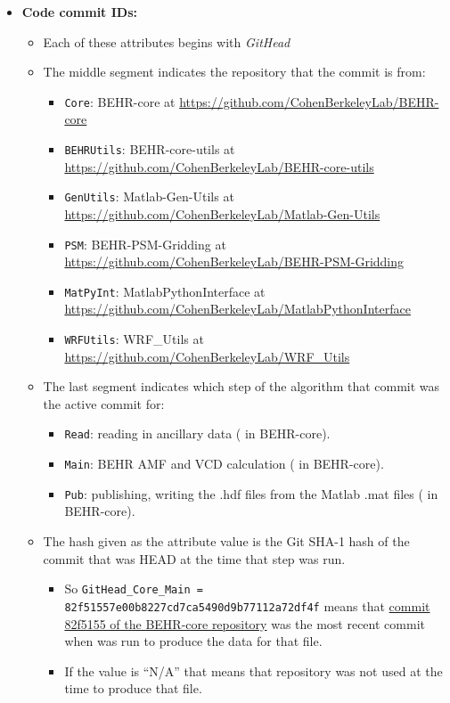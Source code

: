 \documentclass[12pt]{article}
\begin{document}
\begin{itemize}
	\item \textbf{Code commit IDs:}
		\begin{itemize}
		\item Each of these attributes begins with \emph{GitHead}
		\item The middle segment indicates the repository that the commit is from:
			\begin{itemize}
			\item \lstinline$Core$: BEHR-core at \url{https://github.com/CohenBerkeleyLab/BEHR-core}
			\item \lstinline$BEHRUtils$: BEHR-core-utils at \url{https://github.com/CohenBerkeleyLab/BEHR-core-utils}
			\item \lstinline$GenUtils$: Matlab-Gen-Utils at \url{https://github.com/CohenBerkeleyLab/Matlab-Gen-Utils}
			\item \lstinline$PSM$: BEHR-PSM-Gridding at \url{https://github.com/CohenBerkeleyLab/BEHR-PSM-Gridding}
			\item \lstinline$MatPyInt$: MatlabPythonInterface at \url{https://github.com/CohenBerkeleyLab/MatlabPythonInterface}
			\item \lstinline$WRFUtils$: WRF\_Utils at \url{https://github.com/CohenBerkeleyLab/WRF_Utils}
			\end{itemize}
		
		\item The last segment indicates which step of the algorithm that commit was the active commit for:
			\begin{itemize}
			\item \lstinline$Read$: reading in ancillary data ( in BEHR-core).
			\item \lstinline$Main$: BEHR AMF and VCD  calculation ( in BEHR-core).
			\item \lstinline$Pub$: publishing, writing the .hdf files from the Matlab .mat files ( in BEHR-core).
			\end{itemize}
			
		\item The hash given as the attribute value is the Git SHA-1 hash of the commit that was HEAD at the time that step was run.
			\begin{itemize}
			\item So \lstinline$GitHead_Core_Main = 82f51557e00b8227cd7ca5490d9b77112a72df4f$ means that \href{https://github.com/CohenBerkeleyLab/BEHR-core/commit/82f51557e00b8227cd7ca5490d9b77112a72df4f}{commit 82f5155 of the BEHR-core repository} was the most recent commit when  was run to produce the data for that file.
			\item If the value is ``N/A'' that means that repository was not used at the time to produce that file.
			\end{itemize}
		\end{itemize}
	\end{itemize}
\end{document}
